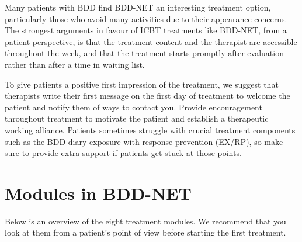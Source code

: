 \documentclass[]{book}
\theoremstyle{definition}
\theoremstyle{definition}
\theoremstyle{definition}
\theoremstyle{remark}
\begin{document}
Many patients with BDD find BDD-NET an interesting treatment option,
particularly those who avoid many activities due to their appearance
concerns. The strongest arguments in favour of ICBT treatments like
BDD-NET, from a patient perspective, is that the treatment content and
the therapist are accessible throughout the week, and that the treatment
starts promptly after evaluation rather than after a time in waiting
list.

To give patients a positive first impression of the treatment, we
suggest that therapists write their first message on the first day of
treatment to welcome the patient and notify them of ways to contact you.
Provide encouragement throughout treatment to motivate the patient and
establish a therapeutic working alliance. Patients sometimes struggle
with crucial treatment components such as the BDD diary exposure with
response prevention (EX/RP), so make sure to provide extra support if
patients get stuck at those points.

\hypertarget{modules-in-bdd-net}{%
\section{Modules in BDD-NET}\label{modules-in-bdd-net}}

Below is an overview of the eight treatment modules. We recommend that
you look at them from a patient's point of view before starting the
first treatment.
\end{document}
